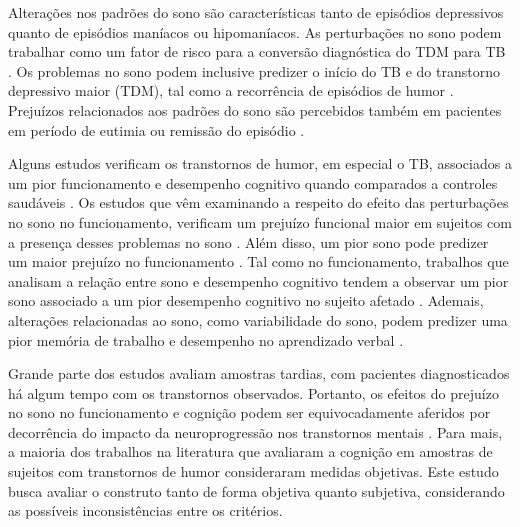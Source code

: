 \documentclass[chapter=TITLE,
               oneside,
               12pt,
               a4paper,
               english,
               brazil]{abntex2}    %
\begin{document}
    Alterações nos padrões do sono são características tanto de episódios depressivos
    quanto de episódios maníacos ou hipomaníacos.
    As perturbações no sono podem trabalhar como um fator de risco para a conversão
    diagnóstica do TDM para TB
    \parencite{ritter_disturbed_2015}.
    Os problemas no sono podem inclusive predizer o início do TB e do transtorno
    depressivo maior (TDM), tal como a recorrência de episódios de humor
    \parencite{melo_sleep_2016,
    kaplan_sleep_2020,
    andrade-gonzalez_initial_2020}.
    Prejuízos relacionados aos padrões do sono são percebidos também em pacientes
    em período de eutimia ou remissão do episódio
    \parencite{de_la_fuente-tomas_sleep_2018}.

    Alguns estudos verificam os transtornos de humor, em especial o TB, associados
    a um pior funcionamento e desempenho cognitivo quando comparados a controles
    saudáveis
    \parencite{reyes_functional_2017,
    kapczinski_cognition_2016}.
    Os estudos que vêm examinando a respeito do efeito das perturbações no
    sono no funcionamento, verificam um prejuízo funcional maior em sujeitos
    com a presença desses problemas no sono
    \parencite{lai_familiality_2014}.
    Além disso, um pior sono pode
    predizer um maior prejuízo no funcionamento
    \parencite{walz_daytime_2013,
    slyepchenko_association_2019}.
    Tal como no funcionamento, trabalhos que analisam a relação entre
    sono e desempenho cognitivo tendem a observar um pior sono associado
    a um pior desempenho cognitivo no sujeito afetado
    \parencite{russo_relationship_2015,
    kaplan_sleep_2020}.
    Ademais, alterações relacionadas ao sono, como variabilidade do sono,
    podem predizer uma pior memória de trabalho e desempenho no aprendizado
    verbal
    \parencite{kanady_association_2017}.

    Grande parte dos estudos avaliam amostras tardias, com pacientes diagnosticados
    há algum tempo com os transtornos observados.
    Portanto, os efeitos do prejuízo no sono no funcionamento e cognição podem
    ser equivocadamente aferidos por decorrência do impacto da neuroprogressão
    nos transtornos mentais
    \parencite{tohen_two-year_2000}.
    Para mais, a maioria dos trabalhos na literatura que avaliaram a cognição
    em amostras de sujeitos com transtornos de humor consideraram medidas
    objetivas. Este estudo busca avaliar o construto tanto de forma objetiva
    quanto subjetiva, considerando as possíveis inconsistências entre os critérios.
    
\end{document}
